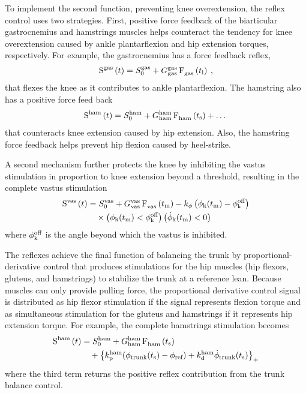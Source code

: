 To implement the second function, preventing knee overextension, the reflex
control uses two strategies. First, positive force feedback of the biarticular
gastrocnemius and hamstrings muscles helps counteract the tendency for knee
overextension caused by ankle plantarflexion and hip extension torques,
respectively. For example, the gastrocnemius has a force feedback reflex,
\begin{align}
    \func{S}[][\tn{gas}]{t} = S_0^\tn{gas} + 
        G_\tn{gas}^\tn{gas} \func{F}[\tn{gas}][]{t_\tn{l}} \:,
        \label{eq:gas_stim}
\end{align}
that flexes the knee as it contributes to ankle plantarflexion. The hamstring
also has a positive force feed back
\begin{align}
    \func{S}[][\tn{ham}]{t} = S_0^\tn{ham} + 
        G_\tn{ham}^\tn{ham} \func{F}[\tn{ham}][]{t_\tn{s}} + \ldots \:
        \label{eq:ham_stim}
\end{align}
that counteracts knee extension caused by hip extension. Also, the hamstring
force feedback helps prevent hip flexion caused by heel-strike.

A second mechanism further protects the knee by inhibiting the vastus
stimulation in proportion to knee extension beyond a threshold, resulting in
the complete vastus stimulation
\begin{align}
    \func{S}[][\tn{vas}]{t} &= S_0^\tn{vas} + 
        G_\tn{vas}^\tn{vas} \func{F}[\tn{vas}][]{t_\tn{m}} 
            -k_\phi \left(\phi_\tn{k}(t_\tn{m}) - \phi_\tn{k}^\tn{off} \right)
            \notag \\
        &\quad \times 
            \left( \phi_\tn{k}(t_\tn{m}) < \phi_\tn{k}^\tn{off} \right)
            \left( \dot \phi_\tn{k}(t_\tn{m}) < 0\right) \label{eq:vas_stim_full} 
\end{align}
where $\phi_{\textnormal{k}}^{\textnormal{off}}$ is the angle beyond which the vastus is inhibited.

The reflexes achieve the final function of balancing the trunk by
proportional-derivative control that produces stimulations for the hip muscles
(hip flexors, gluteus, and hamstrings) to stabilize the trunk at a reference
lean. Because muscles can only provide pulling force, the proportional derivative
control signal is distributed as hip flexor stimulation if the signal represents
flexion torque and as simultaneous stimulation for the gluteus and hamstrings if
it represents hip extension torque. For example, the complete hamstrings
stimulation becomes
\begin{align}
    \func{S}[][\tn{ham}]{t} &= S_0^\tn{ham} + 
        G_\tn{ham}^\tn{ham} \func{F}[\tn{ham}][]{t_\tn{s}} \notag\\
            &\quad +  \left\{ k_\tn{p}^\tn{ham} 
            (\phi_\tn{trunk}(t_\tn{s}) - \phi_{\tn{ref}}) 
            + k_\tn{d}^\tn{ham} \dot{\phi}_{\tn{trunk}}(t_\tn{s}) \right\}_+ 
        \label{eq:ham_stim_full}
\end{align}
where the third term returns the positive reflex contribution from the trunk
balance control. 

